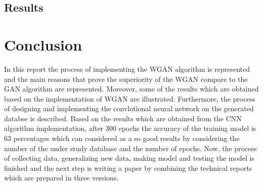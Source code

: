 \documentclass[conference]{IEEEtran}
\begin{document}
\subsection{Results}


\section{Conclusion}
In this report the process of implementing the WGAN algorithm is represented and the main reasons that prove the superiority of the WGAN compare to the GAN algorithm are represented. Moreover, some of the results which are obtained based on the implementation of WGAN are illustrated. Furthermore, the process of designing and implementing the convlotional neural network on the generated databse is described. Based on the results which are obtained from the CNN algorithm implementation, after 300 epochs the accuracy of the training model is 63 percentages which can considered as a so good results by considering the number of the under study database and the number of epochs. Now, the process of collecting data, generalizing new data, making model and
testing the model is finished and the next step is writing a paper by combining the technical reports which are prepared in three versions.
\end{document}
